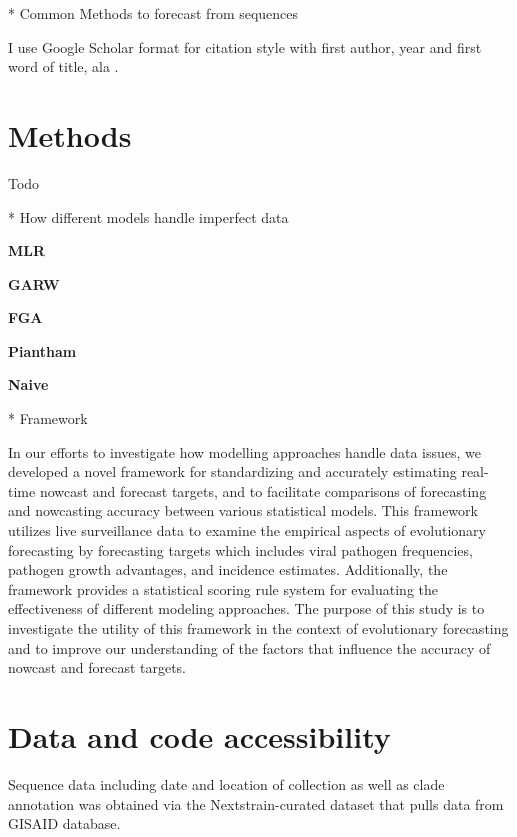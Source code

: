 \documentclass[11pt,oneside,letterpaper]{article}
\begin{document}
* Common Methods to forecast from sequences












I use Google Scholar format for citation style with first author, year and first word of title, ala \cite{hadfield2018nextstrain}.

\section*{Methods}

Todo



* How different models handle imperfect data

\textbf{MLR}

\textbf{GARW}

\textbf{FGA}

\textbf{Piantham}

\textbf{Naive}


* Framework

In our efforts to investigate how modelling approaches handle data issues, we developed a novel framework for standardizing and accurately estimating real-time nowcast and forecast targets, and to facilitate comparisons of forecasting and nowcasting accuracy between various statistical models.
This framework utilizes live surveillance data to examine the empirical aspects of evolutionary forecasting by forecasting targets which includes viral pathogen frequencies, pathogen growth advantages, and incidence estimates. 
Additionally, the framework provides a statistical scoring rule system for evaluating the effectiveness of different modeling approaches.
The purpose of this study is to investigate the utility of this framework in the context of evolutionary forecasting and to improve our understanding of the factors that influence the accuracy of nowcast and forecast targets.







\section*{Data and code accessibility}

Sequence data including date and location of collection as well as clade annotation was obtained via the Nextstrain-curated
dataset that pulls data from GISAID database. 
\end{document}
